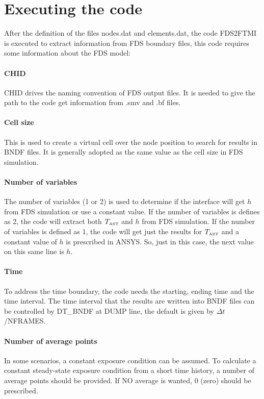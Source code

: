 \documentclass[11pt]{book}
\begin{document}
\section{Executing the code}

After the definition of the files nodes.dat and elements.dat, the code FDS2FTMI is executed to extract information from FDS boundary files, this code requires some information about the FDS model:

\paragraph{CHID} 
{\ct CHID} drives the naming convention of FDS output files. It is needed to give the path to the code get information from .smv and .bf files. 
\paragraph{Cell size} 
This is used to create a virtual cell over the node position to search for results in {\ct BNDF} files. It is generally adopted as the same value as the cell size in FDS simulation.
\paragraph{Number of variables} 
The number of variables (1 or 2) is used to determine if the interface will get $h$ from FDS simulation or use a constant value. 
If the number of variables is defines as 2, the code will extract both $T_{\hbox{\tiny AST}}$ and $h$ from FDS simulation. If the number of variables is defined as 1, the code will get just the results for $T_{\hbox{\tiny AST}}$ and a constant value of $h$ is prescribed in A{\footnotesize NSYS}. So, just in this case, the next value on this same line is $h$. 
\paragraph{Time} 
To address the time boundary, the code needs the starting, ending time and the time interval. The time interval that the results are written into {\ct BNDF} files can be controlled by {\ct DT\_BNDF} at {\ct DUMP} line, the default is given by $\Delta t$/{\footnotesize NFRAMES}.
\paragraph{Number of average points} 
In some scenarios, a constant exposure condition can be assumed. To calculate a constant steady-state exposure condition from 
a short time history, a number of average points should be provided. If NO average is wanted, 0 (zero) should be prescribed.
\end{document}
